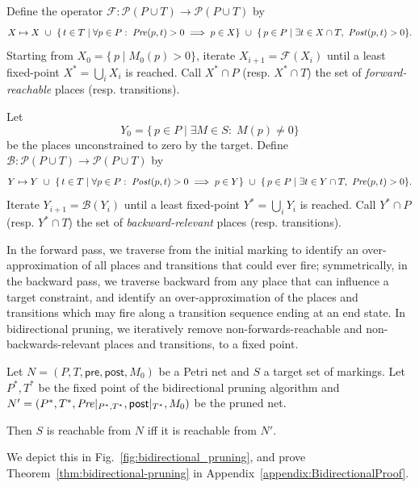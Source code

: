 \begin{definition}
	Define the operator $\mathcal{F}:\mathcal{P}(P\cup T)\to\mathcal{P}(P\cup T)$ by
	\[
	X \mapsto X
	~\cup~
	\{\,t\in T \mid \forall p\in P:\; \mathit{Pre}(p,t)>0 \implies p\in X\}
	~\cup~
	\{\,p\in P \mid \exists t\in X\cap T,\ \mathit{Post}(p,t)>0\}.
	\]
	Starting from $X_0 = \{\,p\mid M_0(p)>0\}$, iterate
	$X_{i+1} = \mathcal{F}(X_i)$ until a least fixed-point
        $X^*=\bigcup_i X_i$ is reached.  Call $X^*\cap P$ (resp. $X^* \cap T$) the set of
        \emph{forward-reachable} places (resp. transitions).
\end{definition}

\begin{definition}
	Let
	\[
	Y_0 = \{\,p\in P \mid \exists M\in S:\;M(p)\neq0\}
	\]
	be the places unconstrained to zero by the target.  Define
	$\mathcal{B}:\mathcal{P}(P\cup T)\to\mathcal{P}(P\cup T)$ by
	\[
	Y \mapsto Y
	~\cup~
	\{\,t\in T \mid \forall p\in P:\; \mathit{Post}(p,t)>0 \implies p\in Y\}
	~\cup~
	\{\,p\in P \mid \exists t\in Y\cap T,\ \mathit{Pre}(p,t)>0\}.
	\]
	Iterate $Y_{i+1} = \mathcal{B}(Y_i)$ until a least fixed-point
        $Y^*=\bigcup_i Y_i$ is reached.  Call $Y^*\cap P$ (resp. $Y^* \cap T$) the set of
        \emph{backward-relevant} places (resp. transitions).
\end{definition}

In the forward pass, we traverse from the initial marking to identify an over-approximation of all places and transitions that could ever fire; symmetrically, in the backward pass, we traverse backward from any place that can influence a target constraint, and identify an over-approximation of the places and transitions which may fire along a transition sequence ending at an end state.
In bidirectional pruning, we iteratively remove non-forwards-reachable and
non-backwards-relevant places and transitions, to a fixed point.

\begin{theorem}
\label{thm:bidirectional-pruning}
  Let $N = (P, T, \mathsf{pre}, \mathsf{post}, M_0)$ be a Petri net and $S$ a target set of markings.
  Let $P^\ast, T^\ast$ be the fixed point of the bidirectional pruning algorithm and $N' = (P^*, T^*, \mathit{Pre}|_{P^*,T^*}, \mathsf{post}|_{T^*}, M_0)$ be the pruned net.

  Then $S$ is reachable from $N$ iff it is reachable from $N'$.
\end{theorem}
%
We depict this in Fig.~\ref{fig:bidirectional_pruning}, and prove Theorem~\ref{thm:bidirectional-pruning} in Appendix~\ref{appendix:BidirectionalProof}.
%

